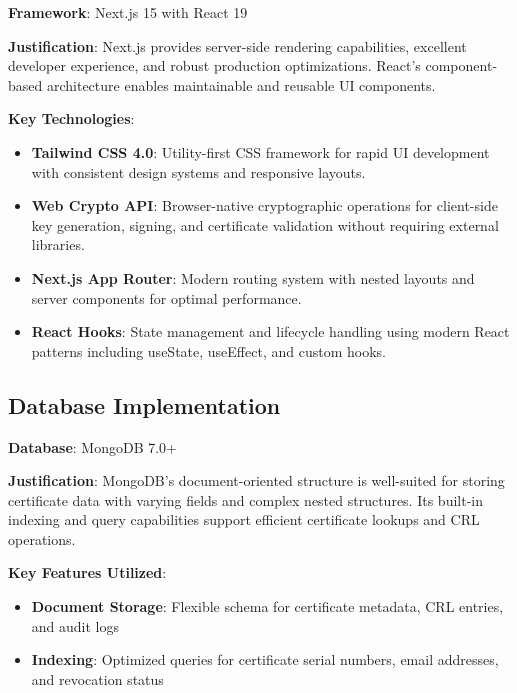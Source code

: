 \textbf{Framework}: Next.js 15 with React 19

\textbf{Justification}: Next.js provides server-side rendering capabilities, excellent developer experience, and robust production optimizations. React's component-based architecture enables maintainable and reusable UI components.

\textbf{Key Technologies}:

\begin{itemize}
    \item \textbf{Tailwind CSS 4.0}: Utility-first CSS framework for rapid UI development with consistent design systems and responsive layouts.
    
    \item \textbf{Web Crypto API}: Browser-native cryptographic operations for client-side key generation, signing, and certificate validation without requiring external libraries.
    
    \item \textbf{Next.js App Router}: Modern routing system with nested layouts and server components for optimal performance.
    
    \item \textbf{React Hooks}: State management and lifecycle handling using modern React patterns including useState, useEffect, and custom hooks.
\end{itemize}

\subsection{Database Implementation}

\textbf{Database}: MongoDB 7.0+

\textbf{Justification}: MongoDB's document-oriented structure is well-suited for storing certificate data with varying fields and complex nested structures. Its built-in indexing and query capabilities support efficient certificate lookups and CRL operations.

\textbf{Key Features Utilized}:

\begin{itemize}
    \item \textbf{Document Storage}: Flexible schema for certificate metadata, CRL entries, and audit logs
    \item \textbf{Indexing}: Optimized queries for certificate serial numbers, email addresses, and revocation status
\end{itemize}

